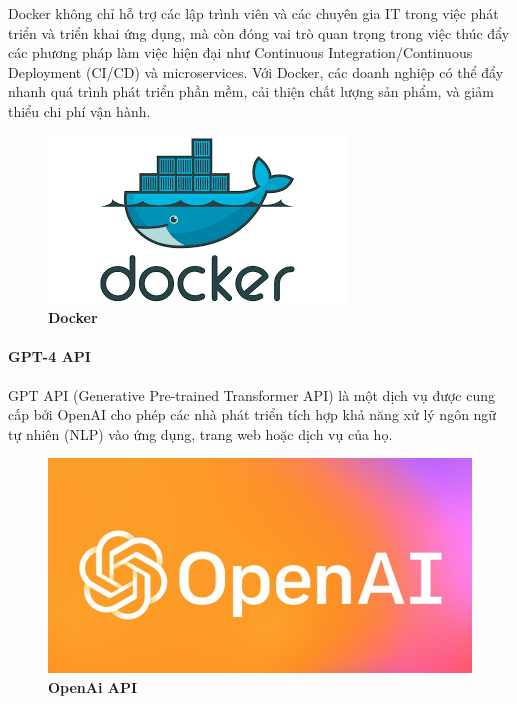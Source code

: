 Docker không chỉ hỗ trợ các lập trình viên và các chuyên gia IT trong việc phát triển và triển khai ứng dụng, mà còn đóng vai trò quan trọng trong việc thúc đẩy các phương pháp làm việc hiện đại như Continuous Integration/Continuous Deployment (CI/CD) và microservices. Với Docker, các doanh nghiệp có thể đẩy nhanh quá trình phát triển phần mềm, cải thiện chất lượng sản phẩm, và giảm thiểu chi phí vận hành.

\begin{figure}[H]
  \centering
  \includegraphics[scale=0.8]{Images/server/deploy/docker.png}
  \caption[Docker]{\bfseries \fontsize{12pt}{0pt}
  \selectfont Docker}
  \label{docker} %
\end{figure}


\paragraph{GPT-4 API}
\mbox{}

GPT API (Generative Pre-trained Transformer API) 
là một dịch vụ được cung cấp bởi OpenAI cho phép các nhà phát triển tích hợp khả năng xử lý ngôn ngữ tự nhiên (NLP) vào ứng dụng, 
trang web hoặc dịch vụ của họ. 

\begin{figure}[H]
  \centering
  \includegraphics[scale=0.9]{Images/server/ai/openai.png}
  \caption[OpenAi API]{\bfseries \fontsize{12pt}{0pt}
  \selectfont OpenAi API}
  \label{openai} %
\end{figure}

